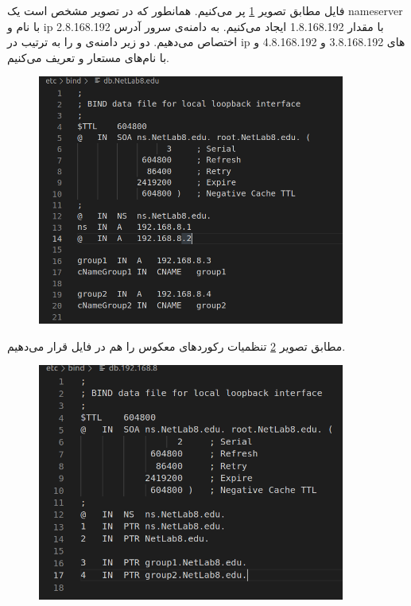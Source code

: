 \documentclass{article}
\begin{document}
فایل 
مطابق تصویر \ref{fig:6} پر می‌کنیم. همانطور که در تصویر مشخص است یک nameserver با نام 
 و ip با مقدار 1.8.168.192 ایجاد می‌کنیم. به دامنه‌ی سرور آدرس 2.8.168.192 اختصاص می‌دهیم. دو زیر دامنه‌ی 
 و 
را به ترتیب در ip های 
3.8.168.192 و
4.8.168.192 و با نام‌های مستعار 
 و 
تعریف می‌کنیم.
\begin{figure}[h!]
	\centering
	\includegraphics[width=0.9\textwidth]{src/6.png}
	\caption{}
	\label{fig:6}
\end{figure}

مطابق تصویر \ref{fig:7} تنظمیات رکورد‌های معکوس را هم در فایل 
 قرار می‌دهیم.

\begin{figure}[h!]
	\centering
	\includegraphics[width=0.9\textwidth]{src/7.png}
	\caption{}
	\label{fig:7}
\end{figure}
\end{document}
